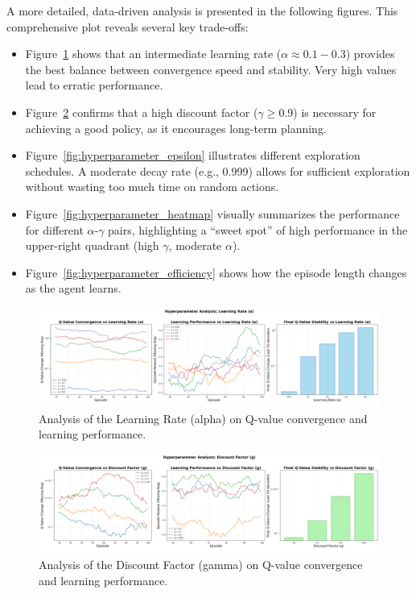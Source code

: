 \documentclass[11pt, a4paper]{article}
\begin{document}
A more detailed, data-driven analysis is presented in the following figures. This comprehensive plot reveals several key trade-offs:
\begin{itemize}
    \item Figure~\ref{fig:hyperparameter_alpha} shows that an intermediate learning rate ($\alpha \approx 0.1-0.3$) provides the best balance between convergence speed and stability. Very high values lead to erratic performance.
    \item Figure~\ref{fig:hyperparameter_gamma} confirms that a high discount factor ($\gamma \geq 0.9$) is necessary for achieving a good policy, as it encourages long-term planning.
    \item Figure~\ref{fig:hyperparameter_epsilon} illustrates different exploration schedules. A moderate decay rate (e.g., 0.999) allows for sufficient exploration without wasting too much time on random actions.
    \item Figure~\ref{fig:hyperparameter_heatmap} visually summarizes the performance for different $\alpha$-$\gamma$ pairs, highlighting a ``sweet spot'' of high performance in the upper-right quadrant (high $\gamma$, moderate $\alpha$).
    \item Figure~\ref{fig:hyperparameter_efficiency} shows how the episode length changes as the agent learns.
\end{itemize}

\begin{figure}[H]
    \centering
    \includegraphics[width=\textwidth]{images/hyperparameter_analysis_alpha.png}
    \caption{Analysis of the Learning Rate (alpha) on Q-value convergence and learning performance.}\label{fig:hyperparameter_alpha}
\end{figure}

\begin{figure}[H]
    \centering
    \includegraphics[width=\textwidth]{images/hyperparameter_analysis_gamma.png}
    \caption{Analysis of the Discount Factor (gamma) on Q-value convergence and learning performance.}\label{fig:hyperparameter_gamma}
\end{figure}
\end{document}
